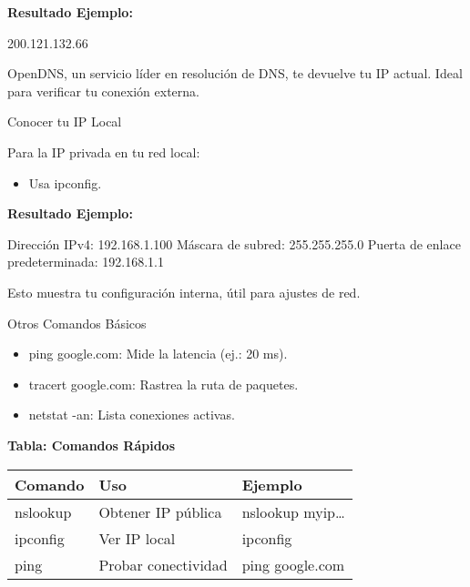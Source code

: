 \documentclass[
  doc,
  floatsintext,
  longtable,
  a4paper,
  nolmodern,
  notxfonts,
  notimes,
  colorlinks=true,linkcolor=blue,citecolor=blue,urlcolor=blue]{apa7}
\newenvironment{Shaded}{\begin{snugshade}}{\end{snugshade}}
\newcommand{\NormalTok}[1]{\textcolor[rgb]{0.00,0.23,0.31}{#1}}
\providecommand{\tightlist}{%
  \setlength{\itemsep}{0pt}\setlength{\parskip}{0pt}}
\begin{document}
\textbf{Resultado Ejemplo:}

\begin{Shaded}
\begin{Highlighting}[]
\NormalTok{200.121.132.66}
\end{Highlighting}
\end{Shaded}

OpenDNS, un servicio líder en resolución de DNS, te devuelve tu IP
actual. Ideal para verificar tu conexión externa.

Conocer tu IP Local

Para la IP privada en tu red local:

\begin{itemize}
\tightlist
\item
  Usa ipconfig.
\end{itemize}

\textbf{Resultado Ejemplo:}

\begin{Shaded}
\begin{Highlighting}[]
\NormalTok{Dirección IPv4: 192.168.1.100}
\NormalTok{Máscara de subred: 255.255.255.0}
\NormalTok{Puerta de enlace predeterminada: 192.168.1.1}
\end{Highlighting}
\end{Shaded}

Esto muestra tu configuración interna, útil para ajustes de red.

Otros Comandos Básicos

\begin{itemize}
\tightlist
\item
  ping google.com: Mide la latencia (ej.: 20 ms).
\item
  tracert google.com: Rastrea la ruta de paquetes.
\item
  netstat -an: Lista conexiones activas.
\end{itemize}

\textbf{Tabla: Comandos Rápidos}

\begin{longtable}[]{@{}lll@{}}
\toprule\noalign{}
Comando & Uso & Ejemplo \\
\midrule\noalign{}
\endhead
\bottomrule\noalign{}
\endlastfoot
nslookup & Obtener IP pública & nslookup myip\ldots{} \\
ipconfig & Ver IP local & ipconfig \\
ping & Probar conectividad & ping google.com \\
\end{longtable}
\end{document}
